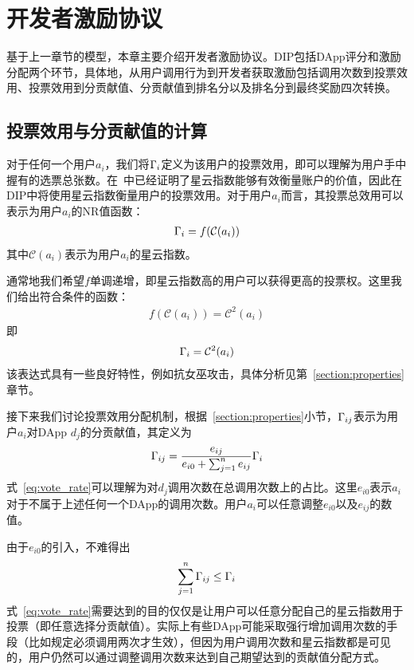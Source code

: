 \section{开发者激励协议}
基于上一章节的模型，本章主要介绍开发者激励协议。DIP包括DApp评分和激励分配两个环节，具体地，从用户调用行为到开发者获取激励包括调用次数到投票效用、投票效用到分贡献值、分贡献值到排名分以及排名分到最终奖励四次转换。

\subsection{投票效用与分贡献值的计算}
对于任何一个用户$a_i$，我们将$\Gamma_i$定义为该用户的投票效用，即可以理解为用户手中握有的选票总张数。在~\cite{Nebulasyellowpaper}中已经证明了星云指数能够有效衡量账户的价值，因此在DIP中将使用星云指数衡量用户的投票效用。对于用户$a_i$而言，其投票总效用可以表示为用户$a_i$的NR值函数：
\begin{align}
\Gamma_i = f(\mathcal{C}(a_i))
\end{align}
其中$\mathcal{C}(a_i)$表示为用户$a_i$的星云指数。

通常地我们希望$f$单调递增，即星云指数高的用户可以获得更高的投票权。这里我们给出符合条件的函数：
\begin{align}
f(\mathcal{C}(a_i))=\mathcal{C}^2(a_i)
\end{align}
即
\begin{align}
\Gamma_i = \mathcal{C}^2(a_i)
\end{align}
该表达式具有一些良好特性，例如抗女巫攻击，具体分析见第~\ref{section:properties}章节。

接下来我们讨论投票效用分配机制，根据~\ref{section:properties}小节，$\Gamma_{ij}$表示为用户$a_i$对DApp $d_j$的分贡献值，其定义为
\begin{align}
\label{eq:vote_rate}
\Gamma_{ij} = \frac{e_{ij}}{e_{i0}+\sum_{j=1}^n {e_{ij}}} \Gamma_i
\end{align}
式~\ref{eq:vote_rate}可以理解为对$d_j$调用次数在总调用次数上的占比。这里$e_{i0}$表示$a_i$对于不属于上述任何一个DApp的调用次数。用户$a_i$可以任意调整$e_{i0}$以及$e_{ij}$的数值。

由于$e_{i0}$的引入，不难得出
$$\sum_{j=1}^n \Gamma_{ij} \leq \Gamma_i$$
\noindent 式~\ref{eq:vote_rate}需要达到的目的仅仅是让用户可以任意分配自己的星云指数用于投票（即任意选择分贡献值）。实际上有些DApp可能采取强行增加调用次数的手段（比如规定必须调用两次才生效），但因为用户调用次数和星云指数都是可见的，用户仍然可以通过调整调用次数来达到自己期望达到的贡献值分配方式。


